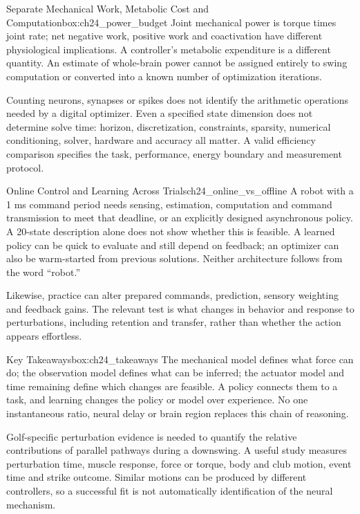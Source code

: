 \begin{principle}{Separate Mechanical Work, Metabolic Cost and Computation}{box:ch24_power_budget}
Joint mechanical power is torque times joint rate; net negative work, positive work and coactivation have different physiological implications. A controller's metabolic expenditure is a different quantity. An estimate of whole-brain power cannot be assigned entirely to swing computation or converted into a known number of optimization iterations.

Counting neurons, synapses or spikes does not identify the arithmetic operations needed by a digital optimizer. Even a specified state dimension does not determine solve time: horizon, discretization, constraints, sparsity, numerical conditioning, solver, hardware and accuracy all matter. A valid efficiency comparison specifies the task, performance, energy boundary and measurement protocol.
\end{principle}

\begin{example}{Online Control and Learning Across Trials}{ch24_online_vs_offline}
A robot with a 1 ms command period needs sensing, estimation, computation and command transmission to meet that deadline, or an explicitly designed asynchronous policy. A 20-state description alone does not show whether this is feasible. A learned policy can be quick to evaluate and still depend on feedback; an optimizer can also be warm-started from previous solutions. Neither architecture follows from the word ``robot.''

Likewise, practice can alter prepared commands, prediction, sensory weighting and feedback gains. The relevant test is what changes in behavior and response to perturbations, including retention and transfer, rather than whether the action appears effortless.
\end{example}

\begin{principle}{Key Takeaways}{box:ch24_takeaways}
The mechanical model defines what force can do; the observation model defines what can be inferred; the actuator model and time remaining define which changes are feasible. A policy connects them to a task, and learning changes the policy or model over experience. No one instantaneous ratio, neural delay or brain region replaces this chain of reasoning.

Golf-specific perturbation evidence is needed to quantify the relative contributions of parallel pathways during a downswing. A useful study measures perturbation time, muscle response, force or torque, body and club motion, event time and strike outcome. Similar motions can be produced by different controllers, so a successful fit is not automatically identification of the neural mechanism.
\end{principle}



